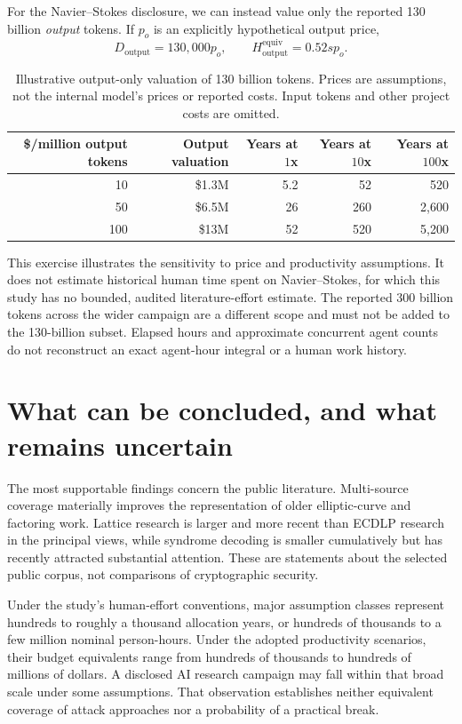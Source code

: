 \documentclass[11pt,letterpaper]{article}
\begin{document}
For the Navier--Stokes disclosure, we can instead value only the reported 130 billion \emph{output} tokens.\cite{openai2026ns} If $p_o$ is an explicitly hypothetical output price,
\begin{equation}
 D_{\mathrm{output}}=130{,}000p_o,\qquad
 H^{\mathrm{equiv}}_{\mathrm{output}}=0.52sp_o.
\end{equation}
\begin{table}[htbp]
\centering\small
\caption{Illustrative output-only valuation of 130 billion tokens. Prices are assumptions, not the internal model's prices or reported costs. Input tokens and other project costs are omitted.}
\label{tab:ns}
\begin{tabular}{rrrrr}\toprule
\$/million output tokens & Output valuation & Years at $1$x & Years at $10$x & Years at $100$x\\\midrule
10 & \$1.3M & 5.2 & 52 & 520\\
50 & \$6.5M & 26 & 260 & 2,600\\
100 & \$13M & 52 & 520 & 5,200\\\bottomrule
\end{tabular}
\end{table}

This exercise illustrates the sensitivity to price and productivity assumptions. It does not estimate historical human time spent on Navier--Stokes, for which this study has no bounded, audited literature-effort estimate. The reported 300 billion tokens across the wider campaign are a different scope and must not be added to the 130-billion subset. Elapsed hours and approximate concurrent agent counts do not reconstruct an exact agent-hour integral or a human work history.



\section{What can be concluded, and what remains uncertain}
The most supportable findings concern the public literature. Multi-source coverage materially improves the representation of older elliptic-curve and factoring work. Lattice research is larger and more recent than ECDLP research in the principal views, while syndrome decoding is smaller cumulatively but has recently attracted substantial attention. These are statements about the selected public corpus, not comparisons of cryptographic security.

Under the study's human-effort conventions, major assumption classes represent hundreds to roughly a thousand allocation years, or hundreds of thousands to a few million nominal person-hours. Under the adopted productivity scenarios, their budget equivalents range from hundreds of thousands to hundreds of millions of dollars. A disclosed AI research campaign may fall within that broad scale under some assumptions. That observation establishes neither equivalent coverage of attack approaches nor a probability of a practical break.
\end{document}
